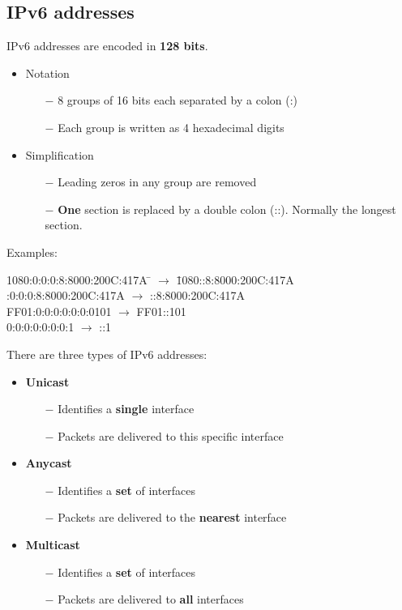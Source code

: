 \documentclass[a4paper, fontsize=8pt, landscape, DIV=1]{scrartcl}
\begin{document}
\begin{multicols*}{4}
		\subsection{IPv6 addresses}
		IPv6 addresses are encoded in \textbf{128 bits}.
		\begin{itemize}[noitemsep]
			\item Notation
			\begin{itemize}
				\item[$-$] 8 groups of 16 bits each separated by a colon (:)
				\item [$-$] Each group is written as 4 hexadecimal digits
			\end{itemize}
			\item Simplification
			\begin{itemize}
				\item[$-$] Leading zeros in any group are removed
				\item[$-$] \textbf{One} section is replaced by a double colon (::).
				Normally the longest section.
			\end{itemize}
		\end{itemize}
		Examples:
		\begin{tabbing}
			1080:0:0:0:8:8000:200C:417A \= $\rightarrow$ \= 1080::8:8000:200C:417A
			:0:0:0:8:8000:200C:417A \> $\rightarrow$ ::8:8000:200C:417A \\
			FF01:0:0:0:0:0:0:0101 \> $\rightarrow$ \> FF01::101 \\
			0:0:0:0:0:0:0:1 \> $\rightarrow$ \> ::1
		\end{tabbing}
		There are three types of IPv6 addresses: 
		\begin{itemize}[noitemsep]
			\item \textbf{Unicast}
			\begin{itemize}
				\item[$-$] Identifies a \textbf{single} interface
				\item[$-$] Packets are delivered to this specific interface
			\end{itemize}
			\item \textbf{Anycast}
			\begin{itemize}
				\item[$-$] Identifies a \textbf{set} of interfaces 
				\item[$-$] Packets are delivered to the \textbf{nearest} interface
			\end{itemize}
			\item \textbf{Multicast}
			\begin{itemize}
				\item[$-$] Identifies a \textbf{set} of interfaces
				\item[$-$] Packets are delivered to \textbf{all} interfaces
			\end{itemize}
		\end{itemize}
		

\end{multicols*}
\end{document}

